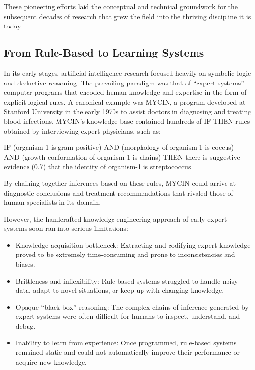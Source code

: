 \documentclass[
  9pt,
  letterpaper,
  abstract,
  titlepage]{scrbook}
\newenvironment{Shaded}{\begin{snugshade}}{\end{snugshade}}
\newcommand{\DataTypeTok}[1]{\textcolor[rgb]{0.68,0.00,0.00}{#1}}
\newcommand{\DecValTok}[1]{\textcolor[rgb]{0.68,0.00,0.00}{#1}}
\newcommand{\FloatTok}[1]{\textcolor[rgb]{0.68,0.00,0.00}{#1}}
\newcommand{\FunctionTok}[1]{\textcolor[rgb]{0.28,0.35,0.67}{#1}}
\newcommand{\NormalTok}[1]{\textcolor[rgb]{0.00,0.23,0.31}{#1}}
\begin{document}
These pioneering efforts laid the conceptual and technical groundwork
for the subsequent decades of research that grew the field into the
thriving discipline it is today.

\subsection{From Rule-Based to Learning
Systems}\label{from-rule-based-to-learning-systems}

In its early stages, artificial intelligence research focused heavily on
symbolic logic and deductive reasoning. The prevailing paradigm was that
of ``expert systems'' - computer programs that encoded human knowledge
and expertise in the form of explicit logical rules. A canonical example
was MYCIN, a program developed at Stanford University in the early 1970s
to assist doctors in diagnosing and treating blood infections. MYCIN's
knowledge base contained hundreds of IF-THEN rules obtained by
interviewing expert physicians, such as:

\begin{Shaded}
\begin{Highlighting}[]
\DataTypeTok{IF}\NormalTok{ (organism}\DecValTok{{-}1} \DataTypeTok{is}\NormalTok{ gram}\DataTypeTok{{-}}\NormalTok{positive) }\DataTypeTok{AND} 
\NormalTok{   (morphology of organism}\DecValTok{{-}1} \DataTypeTok{is}\NormalTok{ coccus) }\DataTypeTok{AND}
\NormalTok{   (growth}\FunctionTok{{-}}\NormalTok{conformation of organism}\DecValTok{{-}1} \DataTypeTok{is}\NormalTok{ chains)}
\DataTypeTok{THEN}\NormalTok{ there }\DataTypeTok{is}\NormalTok{ suggestive evidence (}\FloatTok{0.7}\NormalTok{) that}
\NormalTok{     the identity of organism}\DecValTok{{-}1} \DataTypeTok{is}\NormalTok{ streptococcus}
\end{Highlighting}
\end{Shaded}

By chaining together inferences based on these rules, MYCIN could arrive
at diagnostic conclusions and treatment recommendations that rivaled
those of human specialists in its domain.

However, the handcrafted knowledge-engineering approach of early expert
systems soon ran into serious limitations:

\begin{itemize}
\item
  Knowledge acquisition bottleneck: Extracting and codifying expert
  knowledge proved to be extremely time-consuming and prone to
  inconsistencies and biases.
\item
  Brittleness and inflexibility: Rule-based systems struggled to handle
  noisy data, adapt to novel situations, or keep up with changing
  knowledge.
\item
  Opaque ``black box'' reasoning: The complex chains of inference
  generated by expert systems were often difficult for humans to
  inspect, understand, and debug.
\item
  Inability to learn from experience: Once programmed, rule-based
  systems remained static and could not automatically improve their
  performance or acquire new knowledge.
\end{itemize}
\end{document}
